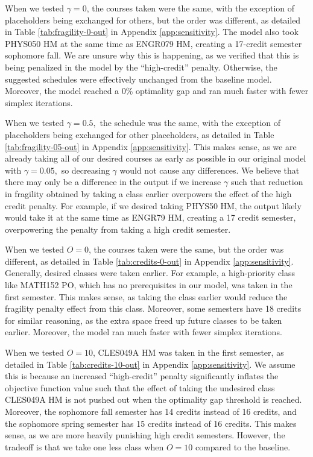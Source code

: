 \documentclass[12pt]{article}
\begin{document}
When we tested $\gamma = 0$, the courses taken were the same, with the exception of placeholders being exchanged for others, but the order was different, as detailed in Table \ref{tab:fragility-0-out} in Appendix \ref{app:sensitivity}. The model also took PHYS050 HM at the same time as ENGR079 HM, creating a 17-credit semester sophomore fall. We are unsure why this is happening, as we verified that this is being penalized in the model by the ``high-credit'' penalty. Otherwise, the suggested schedules were effectively unchanged from the baseline model. Moreover, the model reached a 0\% optimality gap and ran much faster with fewer simplex iterations. 

When we tested $\gamma = 0.5,$ the schedule was the same, with the exception of placeholders being exchanged for other placeholders, as detailed in Table \ref{tab:fragility-05-out} in Appendix \ref{app:sensitivity}. This makes sense, as we are already taking all of our desired courses as early as possible in our original model with $\gamma = 0.05,$ so decreasing $\gamma$ would not cause any differences. We believe that there may only be a difference in the output if we increase $\gamma$ such that reduction in fragility obtained by taking a class earlier overpowers the effect of the high credit penalty. For example, if we desired taking PHYS50 HM, the output likely would take it at the same time as ENGR79 HM, creating a 17 credit semester, overpowering the penalty from taking a high credit semester. 

When we tested $O = 0$, the courses taken were the same, but the order was different, as detailed in Table \ref{tab:credits-0-out} in Appendix \ref{app:sensitivity}. Generally, desired classes were taken earlier. For example, a high-priority class like MATH152 PO, which has no prerequisites in our model, was taken in the first semester. This makes sense, as taking the class earlier would reduce the fragility penalty effect from this class. Moreover, some semesters have 18 credits for similar reasoning, as the extra space freed up future classes to be taken earlier. Moreover, the model ran much faster with fewer simplex iterations. 

When we tested $O = 10$, CLES049A HM was taken in the first semester, as detailed in Table \ref{tab:credits-10-out} in Appendix \ref{app:sensitivity}. We assume this is because an increased ``high-credit'' penalty significantly inflates the objective function value such that the effect of taking the undesired class CLES049A HM is not pushed out when the optimality gap threshold is reached. Moreover, the sophomore fall semester has 14 credits instead of 16 credits, and the sophomore spring semester has 15 credits instead of 16 credits. This makes sense, as we are more heavily punishing high credit semesters. However, the tradeoff is that we take one less class when $O = 10$ compared to the baseline. 
\end{document}
